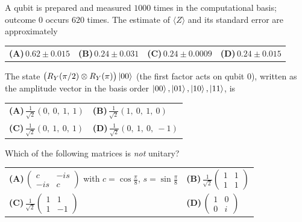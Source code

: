 \documentclass[11pt,a4paper]{article}
\newcommand{\optlabel}[1]{\textbf{(#1)}}
\newenvironment{qitem}[1]{\begin{list}{}{\setlength{\leftmargin}{3.3em}\setlength{\labelwidth}{3.1em}%
  \setlength{\labelsep}{0.2em}\setlength{\topsep}{3pt}\setlength{\parsep}{3pt}}\item[\textbf{Q.#1}\hfill]}{\end{list}}
\newcommand{\qsep}{\par\vspace{2pt}{\color{black!15}\hrule}\vspace{4pt}}
\begin{document}
\begin{qitem}{27}
A qubit is prepared and measured $1000$ times in the computational basis; outcome $0$ occurs $620$ times. The
estimate of $\langle Z\rangle$ and its standard error are approximately
\par\smallskip\noindent\begin{tabularx}{\linewidth}{@{}*{4}{L}@{}}
\optlabel{A}\,$0.62 \pm 0.015$ & \optlabel{B}\,$0.24 \pm 0.031$ & \optlabel{C}\,$0.24 \pm 0.0009$ & \optlabel{D}\,$0.24 \pm 0.015$
\end{tabularx}
\end{qitem}
\qsep

\begin{qitem}{28}
The state $\big(R_Y(\pi/2)\otimes R_Y(\pi)\big)\ket{00}$ (the first factor acts on qubit 0), written as the amplitude
vector in the basis order $\ket{00}, \ket{01}, \ket{10}, \ket{11}$, is
\par\smallskip\noindent\begin{tabularx}{\linewidth}{@{}*{2}{L}@{}}
\optlabel{A}\,$\frac{1}{\sqrt2}(0,\ 0,\ 1,\ 1)$ & \optlabel{B}\,$\frac{1}{\sqrt2}(1,\ 0,\ 1,\ 0)$ \\[3pt]
\optlabel{C}\,$\frac{1}{\sqrt2}(0,\ 1,\ 0,\ 1)$ & \optlabel{D}\,$\frac{1}{\sqrt2}(0,\ 1,\ 0,\ -1)$
\end{tabularx}
\end{qitem}
\qsep

\begin{qitem}{29}
Which of the following matrices is \emph{not} unitary?
\par\smallskip\noindent\begin{tabularx}{\linewidth}{@{}*{2}{L}@{}}
\optlabel{A}\,$\begin{pmatrix}c & -is\\ -is & c\end{pmatrix}$ with $c = \cos\frac\pi8$, $s = \sin\frac\pi8$ & \optlabel{B}\,$\frac{1}{\sqrt2}\begin{pmatrix}1 & 1\\ 1 & 1\end{pmatrix}$ \\[3pt]
\optlabel{C}\,$\frac{1}{\sqrt2}\begin{pmatrix}1 & 1\\ 1 & -1\end{pmatrix}$ & \optlabel{D}\,$\begin{pmatrix}1 & 0\\ 0 & i\end{pmatrix}$
\end{tabularx}
\end{qitem}
\qsep
\end{document}
